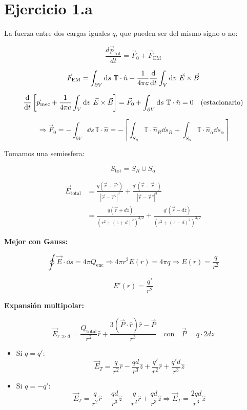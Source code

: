 \documentclass[12pt]{article}
\begin{document}
\section*{Ejercicio 1.a}

La fuerza entre dos cargas iguales \( q \), que pueden ser del mismo signo o no:

\[
\frac{d\vec{p}_{\text{tot}}}{dt} = \vec{F}_0 + \vec{F}_{\text{EM}}
\]

\[
\vec{F}_{\text{EM}} = \int_{\partial V} \dd{s} \, \mathbb{T} \cdot \hat{n} - \frac{1}{4\pi c} \dv{t} \int_V \dd{v} \, \vec{E} \times \vec{B}
\]

\[
\dv{t} \left[ \vec{p}_{\text{mec}} + \frac{1}{4\pi c} \int_V \dd{v} \, \vec{E} \times \vec{B} \right] = \vec{F}_0 + \int_{\partial V} \dd{s} \, \mathbb{T} \cdot \hat{n} = 0 \quad \text{(estacionario)}
\]

\[
\Rightarrow \vec{F}_0 = - \int_{\partial V} \dd{s} \, \mathbb{T} \cdot \hat{n} = - \left[ \int_{S_R} \mathbb{T} \cdot \hat{n}_R \dd{s}_R + \int_{S_\alpha} \mathbb{T} \cdot \hat{n}_\alpha \dd{s}_\alpha \right]
\]

Tomamos una semiesfera:

\[
S_{\text{tot}} = S_R \cup S_\alpha
\]

\begin{align*}
\vec{E}_{\text{total}} &= \frac{q (\vec{r} - \vec{r}')}{|\vec{r} - \vec{r}'|^3} + \frac{q' (\vec{r} - \vec{r}'')}{|\vec{r} - \vec{r}''|^3} \\
&= \frac{q (\vec{r} + d \hat{z})}{(r^2 + (z + d)^2)^{3/2}} + \frac{q' (\vec{r} - d \hat{z})}{(r^2 + (z - d)^2)^{3/2}}
\end{align*}

\textbf{Mejor con Gauss:}

\[
\oint \vec{E} \cdot \dd{s} = 4\pi Q_{\text{enc}} \Rightarrow 4\pi r^2 E(r) = 4\pi q \Rightarrow E(r) = \frac{q}{r^2}
\]

\[
E'(r) = \frac{q'}{r^2}
\]

\textbf{Expansión multipolar:}

\[
\vec{E}_{r \gg d} = \frac{Q_{\text{total}}}{r^2} \hat{r} + \frac{3(\vec{P} \cdot \hat{r}) \hat{r} - \vec{P}}{r^3}
\quad \text{con} \quad \vec{P} = q \cdot 2d \hat{z}
\]

\begin{itemize}
\item Si \( q = q' \):
\[
\vec{E}_T = \frac{q}{r^2} \hat{r} - \frac{q d}{r^3} \hat{z} + \frac{q'}{r^2} \hat{r} + \frac{q' d}{r^3} \hat{z}
\]
\item Si \( q = -q' \):
\[
\vec{E}_T = \frac{q}{r^2} \hat{r} - \frac{q d}{r^3} \hat{z} - \frac{q}{r^2} \hat{r} + \frac{q d}{r^3} \hat{z}
\Rightarrow \vec{E}_T = \frac{2 q d}{r^3} \hat{z}
\]
\end{itemize}
\end{document}
